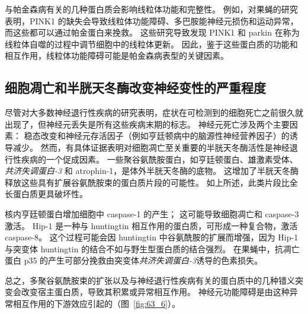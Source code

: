 与帕金森病有关的几种蛋白质会影响线粒体功能和完整性。
例如，对果蝇的研究表明，PINK1 的缺失会导致线粒体功能障碍、多巴胺能神经元损伤和运动异常，而这些都可以通过帕金蛋白来挽救。
这些研究导致发现 PINK1 和 parkin 在称为线粒体自噬的过程中调节细胞中的线粒体更新。
因此，鉴于这些蛋白质的功能和相互作用，线粒体功能障碍可能是帕金森病表型的关键因素。



\subsection{细胞凋亡和半胱天冬酶改变神经变性的严重程度}

尽管对大多数神经退行性疾病的研究表明，症状在可检测到的细胞死亡之前很久就出现了，但神经元丢失是所有这些疾病末期的标志。
神经元死亡涉及两个主要因素： 稳态改变和神经元存活因子（例如亨廷顿病中的脑源性神经营养因子）的诱导减少。
然而，有具体证据表明对细胞凋亡至关重要的半胱天冬酶活性是神经退行性疾病的一个促成因素。
一些聚谷氨酰胺蛋白，如亨廷顿蛋白、雄激素受体、\textit{共济失调蛋白-3} 和 atrophin-1，是体外半胱天冬酶的底物。
这增加了半胱天冬酶释放这些具有扩展谷氨酰胺束的蛋白质片段的可能性。
如上所述，此类片段比全长蛋白质更具破坏性。


核内亨廷顿蛋白增加细胞中 caspase-1 的产生；
这可能导致细胞凋亡和 caspase-3 激活。
Hip-1 是一种与 huntingtin 相互作用的蛋白质，可形成一种复合物，激活 caspase-8。
这个过程可能会因 huntingtin 中谷氨酰胺的扩展而增强，因为 Hip-1 与突变体 huntingtin 的结合不如与野生型蛋白质的结合强烈。
在果蝇中，抗凋亡蛋白 p35 的产生可部分挽救由突变体\textit{共济失调蛋白-3}诱导的色素损失。


总之，多聚谷氨酰胺束的扩张以及与神经退行性疾病有关的蛋白质中的几种错义突变会改变宿主蛋白质，导致其积累或异常相互作用。
神经元功能障碍是由这种异常相互作用的下游效应引起的（图~\ref{fig:63_6}）。


